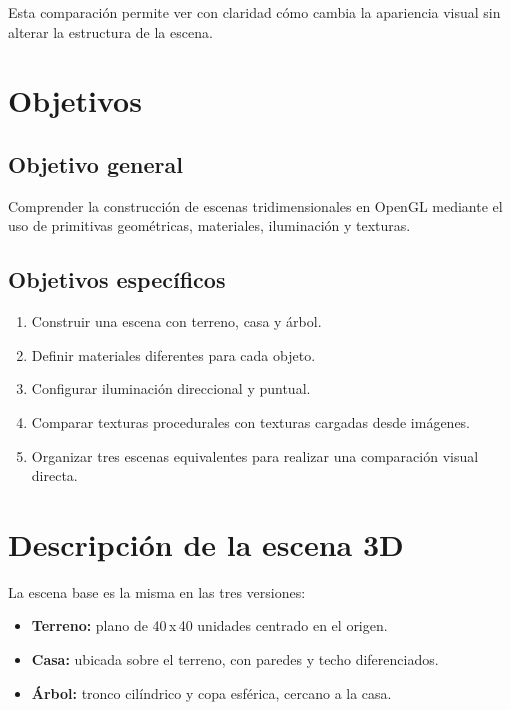 \documentclass[12pt,a4paper]{article}
\begin{document}
Esta comparación permite ver con claridad cómo cambia la apariencia visual sin
alterar la estructura de la escena.

\section{Objetivos}

\subsection{Objetivo general}

Comprender la construcción de escenas tridimensionales en OpenGL mediante el
uso de primitivas geométricas, materiales, iluminación y texturas.

\subsection{Objetivos específicos}

\begin{enumerate}[noitemsep]
  \item Construir una escena con terreno, casa y árbol.
  \item Definir materiales diferentes para cada objeto.
  \item Configurar iluminación direccional y puntual.
  \item Comparar texturas procedurales con texturas cargadas desde imágenes.
  \item Organizar tres escenas equivalentes para realizar una comparación
        visual directa.
\end{enumerate}

\section{Descripción de la escena 3D}

La escena base es la misma en las tres versiones:

\begin{itemize}[noitemsep]
  \item \textbf{Terreno:} plano de 40\,x\,40 unidades centrado en el origen.
  \item \textbf{Casa:} ubicada sobre el terreno, con paredes y techo diferenciados.
  \item \textbf{Árbol:} tronco cilíndrico y copa esférica, cercano a la casa.
\end{itemize}
\end{document}
